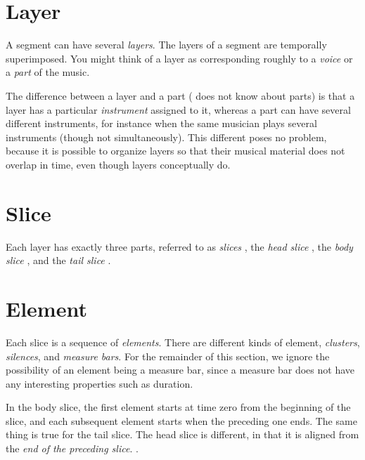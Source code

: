 \section{Layer}

A segment can have several \emph{layers}.  The layers of
a segment are temporally superimposed.  You might think of a layer as
corresponding roughly to a \emph{voice}  or a \emph{part}
 of the music.  

The difference between a layer and a part ({\gs} does not know about
parts) is that a layer has a particular \emph{instrument}
 assigned to it, whereas a part can have several
different instruments, for instance when the same musician plays
several instruments (though not simultaneously).  This different poses
no problem, because it is possible to organize {\gs} layers so that
their musical material does not overlap in time, even though layers
conceptually do. 

\section{Slice}

Each layer has exactly three parts, referred to as \emph{slices}
, the \emph{head slice}
, the \emph{body slice}
, and the \emph{tail slice}
. 

\section{Element}

Each slice is a sequence of \emph{elements}.  There are
different kinds of element, \emph{clusters},
\emph{silences}, and \emph{measure bars}.  For the remainder of this section, we ignore the possibility of
an element being a measure bar, since a measure bar does not have any
interesting properties such as duration.

In the body slice, the first element starts at time zero from the
beginning of the slice, and each subsequent element starts when the
preceding one ends.  The same thing is true for the tail
slice.  The head slice is
different, in that it is aligned from the \emph{end of the preceding
slice}.  .

